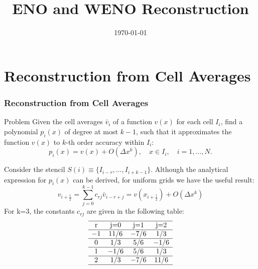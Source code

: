 \documentclass{beamer}
\title{ENO and WENO Reconstruction}
\author{}
\date{\today}
\begin{document}
\frame{\titlepage}

\begin{frame}
    \tableofcontents
\end{frame}

\section{Reconstruction from Cell Averages}
\begin{frame}[allowframebreaks]
    \frametitle{Reconstruction from Cell Averages}
    \begin{block}{Problem}
        Given the cell averages \(\bar{v}_i\) of a function \(v(x)\) for each cell \(I_i\), find a polynomial \(p_i(x)\) of degree at most \(k-1\), such that it approximates the function \(v(x)\) to \(k\)-th order accuracy within \(I_i\):
        \[
            p_i(x) = v(x) + O(\Delta x^k), \quad x \in I_i, \quad i = 1,\ldots,N.
        \]
    \end{block}
    Consider the stencil \(S(i)\equiv \{I_{i-r},\ldots,I_{i+k-1}\} \). Although the analytical expression for \(p_i(x)\) can be derived, for uniform grids we have the useful result:
    \[
        v_{i+\frac{1}{2}} = \sum_{j=0}^{k-1}c_{rj}\bar{v}_{i-r+j} = v\left( x_{i+\frac{1}{2}} \right) + O(\Delta x^k)
    \]
    For k=3, the constants \(c_{rj}\) are given in the following table:
    \[
        \begin{array}{cccc}
            \hline
            \text{r} & \text{j=0} & \text{j=1} & \text{j=2} \\
            \hline
            -1       & 11/6       & -7/6       & 1/3        \\
            \hline
            0        & 1/3        & 5/6        & -1/6       \\
            \hline
            1        & -1/6       & 5/6        & 1/3        \\
            \hline
            2        & 1/3        & -7/6       & 11/6       \\
            \hline
        \end{array}
    \]
\end{frame}
\end{document}
